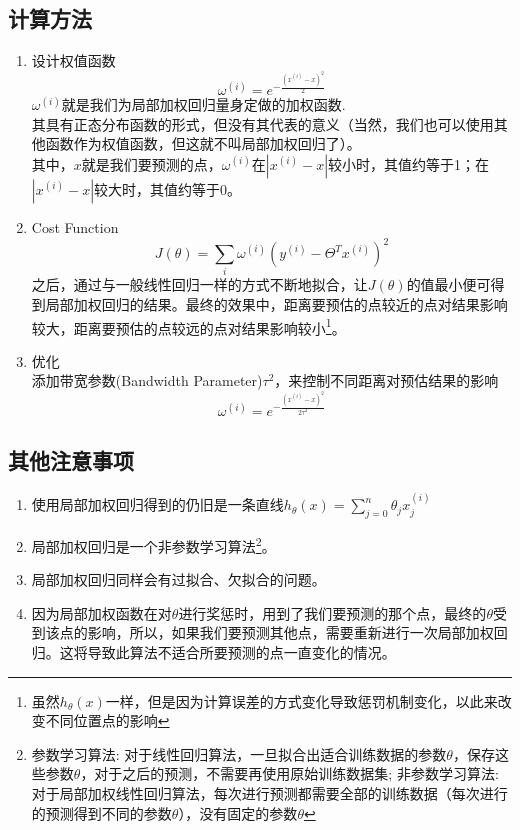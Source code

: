 \subsection{计算方法}
\begin{enumerate}
	\item 设计权值函数
	\begin{equation}
		\omega^{(i)} = e^{-\frac{(x^{(i)}-x)^2}{2}}
	\end{equation}
	$\omega^{(i)}$就是我们为局部加权回归量身定做的加权函数. \\
	其具有正态分布函数的形式，但没有其代表的意义（当然，我们也可以使用其他函数作为权值函数，但这就不叫局部加权回归了）。\\
	其中，$x$就是我们要预测的点，$\omega^{(i)}$在$|x^{(i)}-x|$较小时，其值约等于1；在$|x^{(i)}-x|$较大时，其值约等于0。\\
	\item Cost Function
	\begin{equation}
		J(\theta) = \sum_{i}\omega^{(i)}(y^{(i)} - \Theta^Tx^{(i)})^2
	\end{equation}
	之后，通过与一般线性回归一样的方式不断地拟合，让$J(\theta)$的值最小便可得到局部加权回归的结果。最终的效果中，距离要预估的点较近的点对结果影响较大，距离要预估的点较远的点对结果影响较小\footnote{虽然$h_\theta(x)$一样，但是因为计算误差的方式变化导致惩罚机制变化，以此来改变不同位置点的影响}。
	\item 优化 \\
	添加带宽参数(Bandwidth Parameter)$\tau^2$，来控制不同距离对预估结果的影响
	\begin{equation}
		\omega^{(i)} = e^{-\frac{(x^{(i)}-x)^2}{2\tau^2}}
	\end{equation}
	
\end{enumerate}

\subsection{其他注意事项}
\begin{enumerate}
	\item 使用局部加权回归得到的仍旧是一条直线$h_{\theta}(x)= \sum_{j=0}^n\theta_jx_j^{(i)}$
	\item 局部加权回归是一个非参数学习算法\footnote{参数学习算法: 对于线性回归算法，一旦拟合出适合训练数据的参数$\theta$，保存这些参数$\theta$，对于之后的预测，不需要再使用原始训练数据集; 非参数学习算法: 对于局部加权线性回归算法，每次进行预测都需要全部的训练数据（每次进行的预测得到不同的参数$\theta$），没有固定的参数$\theta$}。
	\item 局部加权回归同样会有过拟合、欠拟合的问题。
	\item 因为局部加权函数在对$\theta$进行奖惩时，用到了我们要预测的那个点，最终的$\theta$受到该点的影响，所以，如果我们要预测其他点，需要重新进行一次局部加权回归。这将导致此算法不适合所要预测的点一直变化的情况。
\end{enumerate}







